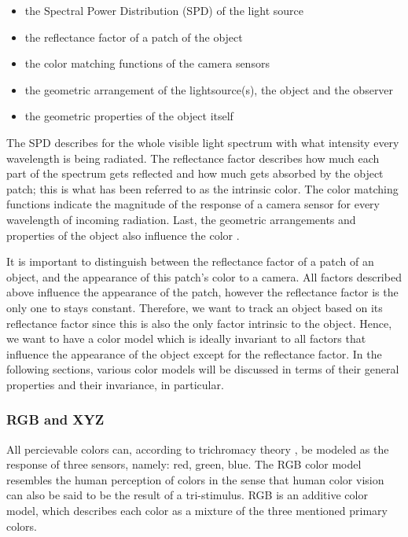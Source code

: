 \documentclass[a4paper,11pt]{article}
\begin{document}
\begin{itemize}

\item the Spectral Power Distribution (SPD) of the light source

\item the reflectance factor of a patch of the object

\item the color matching functions of the camera sensors 

\item the geometric arrangement of the lightsource(s), the object and the observer

\item the geometric properties of the object itself

\end{itemize}

The SPD describes for the whole visible light spectrum with what intensity every wavelength is being radiated. The reflectance factor describes how much each part of the spectrum gets reflected and how much gets absorbed by the object patch; this is what has been referred to as the intrinsic color. The color matching functions indicate the magnitude of the response of a camera sensor for every wavelength of incoming radiation. Last, the geometric arrangements and properties of the object also influence the color \cite{gevers_color}.



It is important to distinguish between the reflectance factor of a patch of an object, and the appearance of this patch's color to a camera. All factors described above influence the appearance of the patch, however the reflectance factor is the only one to stays constant. Therefore, we want to track an object based on its reflectance factor since this is also the only factor intrinsic to the object.  Hence, we want to have a color model which is ideally invariant to all factors that influence the appearance of the object except for the reflectance factor. In the following sections, various color models will be discussed in terms of their general properties and their invariance, in particular. 



\subsubsection{RGB and XYZ}

		

All percievable colors can, according to trichromacy theory \cite{gevers_color}, be modeled as the response of three sensors, namely: red, green, blue. The RGB color model resembles the human perception of colors in the sense that human color vision can also be said to be the result of a tri-stimulus.  RGB is an additive color model, which describes each color as a mixture of the three mentioned primary colors.
\end{document}
